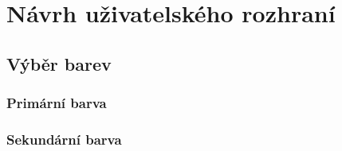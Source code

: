 \section{Návrh uživatelského rozhraní}


\subsection{Výběr barev}



\subsubsection{Primární barva}




\subsubsection{Sekundární barva}

